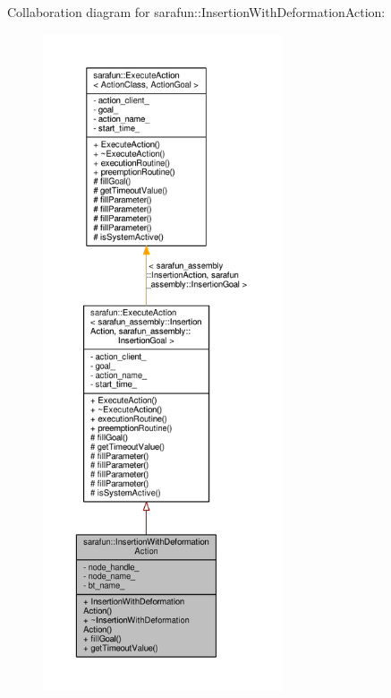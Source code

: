 Collaboration diagram for sarafun\-:\-:Insertion\-With\-Deformation\-Action\-:
\nopagebreak
\begin{figure}[H]
\begin{center}
\leavevmode
\includegraphics[height=550pt]{da/dd6/classsarafun_1_1InsertionWithDeformationAction__coll__graph}
\end{center}
\end{figure}
